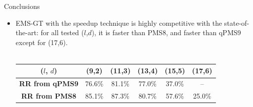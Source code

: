 \documentclass[pdf,xcolor={dvipsnames}]{beamer}
\begin{document}
	

	\begin{frame}{Conclusions}
		\begin{itemize}
		\item EMS-GT with the speedup technique { is highly competitive with the state-of-the-art}: for all tested ($l$,$d$), it is faster than PMS8, and faster than qPMS9 except for (17,6).\\\ \\

		\begin{table}
			\footnotesize
			\renewcommand{\arraystretch}{1.3}
			\label{tbl:runtimes_v_pms}
			\centering
			\begin{tabular}{|c|c|c|c|c|c|}
			\hline \bfseries ($l$, $d$) & \bfseries (9,2) & \bfseries (11,3) & \bfseries (13,4) & \bfseries (15,5) & \bfseries (17,6)\\
			\hline \bfseries RR from qPMS9 & 76.6\% &  81.1\% & 77.0\% & 37.0\% & --\\
			\bfseries RR from PMS8  & 85.1\% &  87.3\% & 80.7\% & 57.6\% & 25.0\%\\
			\hline
			\end{tabular}
		\end{table}\ \\\ \\\ \\

		\end{itemize}
		\end{frame}
\end{document}
